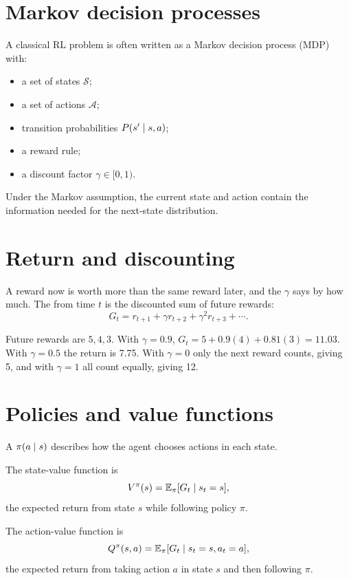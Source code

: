 \section{Markov decision processes}

A classical RL problem is often written as a Markov decision process (MDP) with:

\begin{itemize}
  \item a set of states $\mathcal{S}$;
  \item a set of actions $\mathcal{A}$;
  \item transition probabilities $P(s'\mathrel{|} s,a)$;
  \item a reward rule;
  \item a discount factor $\gamma\in[0,1)$.
\end{itemize}

Under the Markov assumption, the current state and action contain the information needed for the next-state distribution.

\section{Return and discounting}

A reward now is worth more than the same reward later, and the  $\gamma$ says by how much. The  from time $t$ is the discounted sum of future rewards:
\[
  G_t=r_{t+1}+\gamma r_{t+2}+\gamma^2r_{t+3}+\cdots.
\]

\begin{workedexample}
Future rewards are $5,4,3$. With $\gamma=0.9$, $G_t=5+0.9(4)+0.81(3)=11.03$. With $\gamma=0.5$ the return is 7.75. With $\gamma=0$ only the next reward counts, giving 5, and with $\gamma=1$ all count equally, giving 12.
\end{workedexample}

\section{Policies and value functions}

A  $\pi(a\mathrel{|} s)$ describes how the agent chooses actions in each state.

The state-value function is
\[
  V^{\pi}(s)=\mathbb{E}_{\pi}[G_t\mathrel{|} s_t=s],
\]
the expected return from state $s$ while following policy $\pi$.

The action-value function is
\[
  Q^{\pi}(s,a)=\mathbb{E}_{\pi}[G_t\mathrel{|} s_t=s,a_t=a],
\]
the expected return from taking action $a$ in state $s$ and then following $\pi$.

